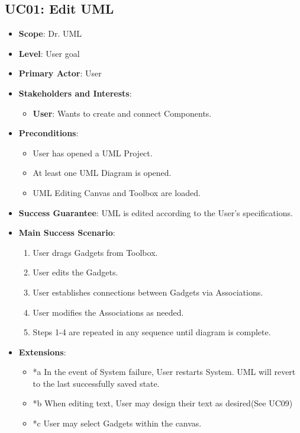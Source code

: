 \documentclass[12pt]{article}
\begin{document}
\subsection{UC01: Edit UML}
\begin{itemize}
    \item \textbf{Scope}: Dr. UML
    \item \textbf{Level}: User goal
    \item \textbf{Primary Actor}: User
    \item \textbf{Stakeholders and Interests}:
    \begin{itemize}
        \item \textbf{User}: Wants to create and connect Components.
    \end{itemize}
    \item \textbf{Preconditions}:
    \begin{itemize}
        \item User has opened a UML Project.
        \item At least one UML Diagram is opened.
        \item UML Editing Canvas and Toolbox are loaded.
    \end{itemize}
    \item \textbf{Success Guarantee}: UML is edited according to the User’s specifications.
    \item \textbf{Main Success Scenario}:
    \begin{enumerate}
        \item User drags Gadgets from Toolbox.
        \item User edits the Gadgets.
        \item User establishes connections between Gadgets via Associations.
        \item User modifies the Associations as needed.
        \item Steps 1-4 are repeated in any sequence until diagram is complete.
    \end{enumerate}
    \item \textbf{Extensions}:
    \begin{itemize}
        \item *a In the event of System failure, User restarts System. UML will revert to the last successfully saved state.
        \item *b When editing text, User may design their text as desired(See UC09)
        \item *c User may select Gadgets within the canvas.

\end{itemize}
\end{itemize}
\end{document}
